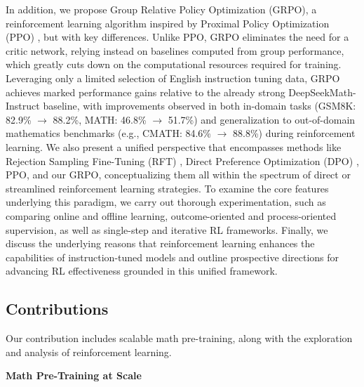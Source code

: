 In addition, we propose Group Relative Policy Optimization (GRPO), a reinforcement learning algorithm inspired by Proximal Policy Optimization (PPO) \citep{schulman2017proximal}, but with key differences. Unlike PPO, GRPO eliminates the need for a critic network, relying instead on baselines computed from group performance, which greatly cuts down on the computational resources required for training. Leveraging only a limited selection of English instruction tuning data, GRPO achieves marked performance gains relative to the already strong DeepSeekMath-Instruct baseline, with improvements observed in both in-domain tasks (GSM8K: 82.9\% $\rightarrow$ 88.2\%, MATH: 46.8\% $\rightarrow$ 51.7\%) and generalization to out-of-domain mathematics benchmarks (e.g., CMATH: 84.6\% $\rightarrow$ 88.8\%) during reinforcement learning. We also present a unified perspective that encompasses methods like Rejection Sampling Fine-Tuning (RFT) \citep{yuan2023scaling}, Direct Preference Optimization (DPO) \citep{dpo}, PPO, and our GRPO, conceptualizing them all within the spectrum of direct or streamlined reinforcement learning strategies. To examine the core features underlying this paradigm, we carry out thorough experimentation, such as comparing online and offline learning, outcome-oriented and process-oriented supervision, as well as single-step and iterative RL frameworks. Finally, we discuss the underlying reasons that reinforcement learning enhances the capabilities of instruction-tuned models and outline prospective directions for advancing RL effectiveness grounded in this unified framework.

\subsection{Contributions}
Our contribution includes scalable math pre-training, along with the exploration and analysis of reinforcement learning.

\textbf{Math Pre-Training at Scale}

